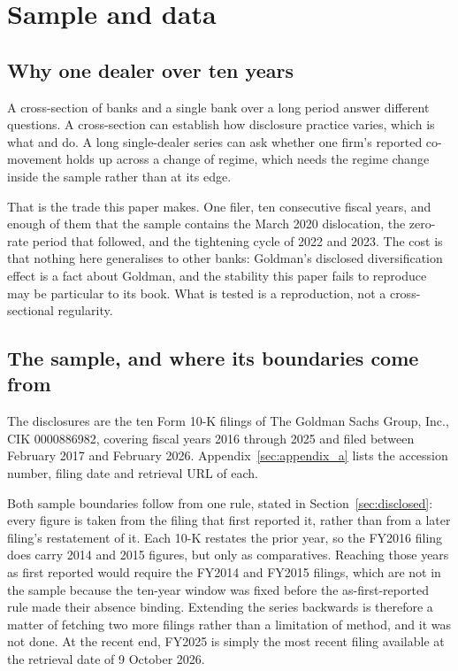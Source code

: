 %

\section{Sample and data}\label{sec:sample}

\subsection{Why one dealer over ten years}

A cross-section of banks and a single bank over a long period answer different
questions. A cross-section can establish how disclosure practice varies, which
is what \citet{perignon2010level} and \citet{campbell2022australia} do. A long
single-dealer series can ask whether one firm's reported co-movement holds up
across a change of regime, which needs the regime change inside the sample
rather than at its edge.

That is the trade this paper makes. One filer, ten consecutive fiscal years,
and enough of them that the sample contains the March 2020 dislocation, the
zero-rate period that followed, and the tightening cycle of 2022 and 2023. The
cost is that nothing here generalises to other banks: Goldman's disclosed
diversification effect is a fact about Goldman, and the stability this paper
fails to reproduce may be particular to its book. What is tested is a
reproduction, not a cross-sectional regularity.

\subsection{The sample, and where its boundaries come from}

The disclosures are the ten Form 10-K filings of The Goldman Sachs Group, Inc.,
CIK 0000886982, covering fiscal years 2016 through 2025 and filed between
February 2017 and February 2026. Appendix~\ref{sec:appendix_a} lists the
accession number, filing date and retrieval URL of each.

Both sample boundaries follow from one rule, stated in
Section~\ref{sec:disclosed}: every figure is taken from the filing that first
reported it, rather than from a later filing's restatement of it. Each 10-K
restates the prior year, so the FY2016 filing does carry 2014 and 2015 figures,
but only as comparatives. Reaching those years as first reported would
require the FY2014 and FY2015 filings, which are not in the sample because the
ten-year window was fixed before the as-first-reported rule made their absence
binding. Extending the series backwards is therefore a matter of fetching two
more filings rather than a limitation of method, and it was not done. At the recent end, FY2025 is
simply the most recent filing available at the retrieval date of 9 October
2026.


